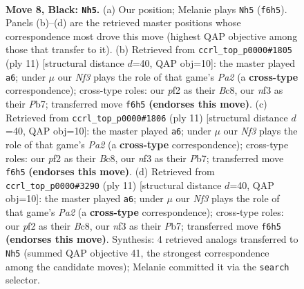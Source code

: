 \documentclass[11pt]{article}
\begin{document}
\begin{figure}[p]\centering
\begin{subfigure}{0.46\textwidth}\centering
\resizebox{\linewidth}{!}{%
\newchessgame
\chessboard[
  setfen={1rbq1rk1/pp1pppbp/2n2np1/2p5/2P4P/5NP1/PP1PPPB1/RNBQ1RK1 b - - 2 8},
  showmover=false,
  pgfstyle=straightmove, color=movearrow, markmove={f6-h5}
]}
\caption{}
\end{subfigure}\hfill
\begin{subfigure}{0.46\textwidth}\centering
\resizebox{\linewidth}{!}{%
\newchessgame
\chessboard[
  setfen={r1bq1rk1/ppppppbp/2n2np1/8/2P5/2N2NP1/PP1PPPBP/R1BQ1RK1 b - - 6 6},
  showmover=false,
  pgfstyle=straightmove, color=movearrow, markmove={a7-a6}
]}
\caption{}
\end{subfigure}
\\[4pt]
\begin{subfigure}{0.46\textwidth}\centering
\resizebox{\linewidth}{!}{%
\newchessgame
\chessboard[
  setfen={r1bq1rk1/ppppppbp/2n2np1/8/2P5/2N2NP1/PP1PPPBP/R1BQ1RK1 b - - 6 6},
  showmover=false,
  pgfstyle=straightmove, color=movearrow, markmove={a7-a6}
]}
\caption{}
\end{subfigure}\hfill
\begin{subfigure}{0.46\textwidth}\centering
\resizebox{\linewidth}{!}{%
\newchessgame
\chessboard[
  setfen={r1bq1rk1/ppppppbp/2n2np1/8/2P5/2N2NP1/PP1PPPBP/R1BQ1RK1 b - - 6 6},
  showmover=false,
  pgfstyle=straightmove, color=movearrow, markmove={a7-a6}
]}
\caption{}
\end{subfigure}
\caption{\textbf{Move 8, Black: \texttt{Nh5}.} (a) Our position; Melanie plays \texttt{Nh5} (\texttt{f6h5}). Panels (b)--(d) are the retrieved master positions whose correspondence most drove this move (highest QAP objective among those that transfer to it). (b) Retrieved from \texttt{ccrl\_top\_p0000\#1805} (ply 11) [structural distance $d$=40, QAP obj=10]: the master played \texttt{a6}; under $\mu$ our \emph{Nf3} plays the role of that game's \emph{Pa2} (a \textbf{cross-type} correspondence); cross-type roles: our \emph{p}f2 as their \emph{B}c8, our \emph{n}f3 as their \emph{P}b7; transferred move \texttt{f6h5} \textbf{(endorses this move)}. (c) Retrieved from \texttt{ccrl\_top\_p0000\#1806} (ply 11) [structural distance $d$=40, QAP obj=10]: the master played \texttt{a6}; under $\mu$ our \emph{Nf3} plays the role of that game's \emph{Pa2} (a \textbf{cross-type} correspondence); cross-type roles: our \emph{p}f2 as their \emph{B}c8, our \emph{n}f3 as their \emph{P}b7; transferred move \texttt{f6h5} \textbf{(endorses this move)}. (d) Retrieved from \texttt{ccrl\_top\_p0000\#3290} (ply 11) [structural distance $d$=40, QAP obj=10]: the master played \texttt{a6}; under $\mu$ our \emph{Nf3} plays the role of that game's \emph{Pa2} (a \textbf{cross-type} correspondence); cross-type roles: our \emph{p}f2 as their \emph{B}c8, our \emph{n}f3 as their \emph{P}b7; transferred move \texttt{f6h5} \textbf{(endorses this move)}. Synthesis: 4 retrieved analogs transferred to \texttt{Nh5} (summed QAP objective 41, the strongest correspondence among the candidate moves); Melanie committed it via the \texttt{search} selector.}
\label{fig:thought-m15}
\end{figure}
\end{document}
